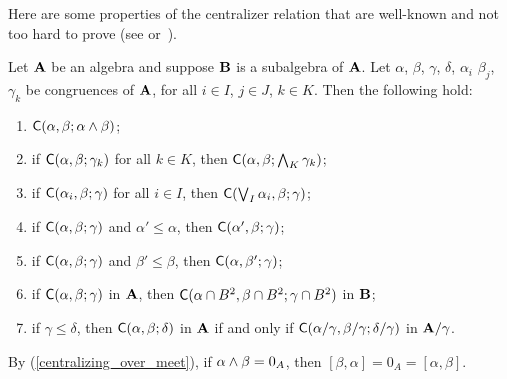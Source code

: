 Here are some properties of the centralizer relation
that are well-known and not too hard to prove
(see \cite[Prop~3.4]{HM:1988} or~\cite[Thm~2.19]{MR3076179}).
\begin{lem}
\label{lem:centralizers}
Let $\mathbf{A}$ be an algebra and suppose
$\mathbf{B}$ is a subalgebra of $\mathbf{A}$. 
Let $\alpha$, $\beta$, $\gamma$, $\delta$, $\alpha_i$
$\beta_j$, $\gamma_k$
be congruences of $\mathbf{A}$, for all 
$i \in I$, $j\in J$, $k \in K$. Then the following hold:
\begin{enumerate}
\item \label{centralizing_over_meet}
  $\mathsf{C}(\alpha, \beta; \alpha \wedge \beta)$;
\item \label{centralizing_over_meet2}
  if $\mathsf{C}(\alpha,  \beta;  \gamma_k)$ for all $k \in K$, then
  $\mathsf{C}(\alpha,  \beta;  \bigwedge_{K}\gamma_k)$;
\item \label{centralizing_over_join1}
  if $\mathsf{C}(\alpha_i,  \beta;  \gamma)$ for all $i\in I$, then
  $\mathsf{C}(\bigvee_{I}\alpha_i,  \beta; \gamma)$;
\item \label{monotone_centralizers1}
  if $\mathsf{C}(\alpha,  \beta;  \gamma)$ and $\alpha' \leq \alpha$, then 
  $\mathsf{C}(\alpha',  \beta;  \gamma)$;
\item \label{monotone_centralizers2}
  if $\mathsf{C}(\alpha,  \beta;  \gamma)$ and $\beta' \leq \beta$, then
  $\mathsf{C}(\alpha,  \beta';  \gamma)$;
\item \label{centralizing_over_subalg}
  if $\mathsf{C}(\alpha,  \beta;  \gamma)$ in $\mathbf{A}$, 
  then $\mathsf{C}(\alpha\cap B^2,  \beta\cap B^2; \gamma\cap B^2)$ in $\mathbf{B}$;
\item \label{centralizing_factors}
  if $\gamma \leq \delta$, then $\mathsf{C}(\alpha,  \beta;  \delta)$
  in $\mathbf{A}$ if and only if $\mathsf{C}(\alpha/\gamma,  \beta/\gamma;  \delta/\gamma)$
  in $\mathbf{A}/\gamma$.
\end{enumerate}
\end{lem}


\begin{rem}
By (\ref{centralizing_over_meet}), 
if $\alpha \wedge \beta = 0_{A}$,  
then %
$[\beta, \alpha] = 0_A = [\alpha, \beta]$.
\end{rem}

